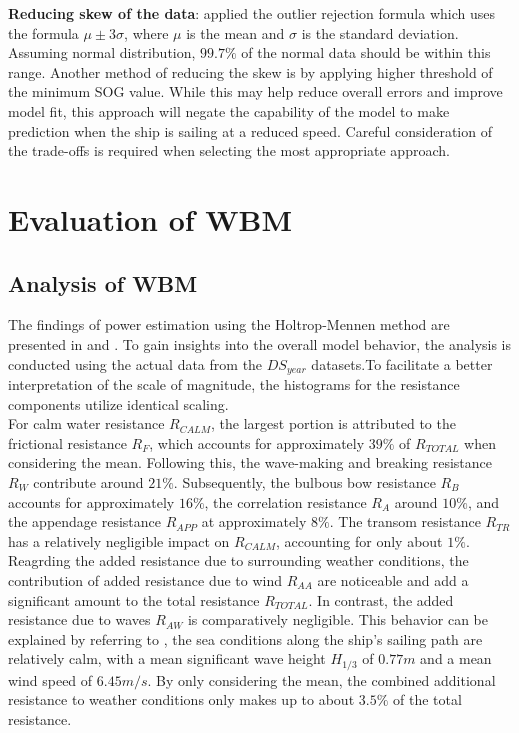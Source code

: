 \textbf{Reducing skew of the data}:  applied the outlier rejection formula which uses the formula $\mu \pm 3\sigma$, where $\mu$ is the mean and $\sigma$ is the standard deviation. Assuming normal distribution, $99.7\%$ of the normal data should be within this range. Another method of reducing the skew is by applying higher threshold of the minimum SOG value. While this may help reduce overall errors and improve model fit, this approach will negate the capability of the model to make prediction when the ship is sailing at a reduced speed. Careful consideration of the trade-offs is required when selecting the most appropriate approach.\\

\section{Evaluation of WBM}\label{sec:WBM_perf_eval}

\subsection{Analysis of WBM}\label{sec:Power_estimation_actual}

The findings of power estimation using the Holtrop-Mennen method are presented in  and . To gain insights into the overall model behavior, the analysis is conducted using the actual data from the $DS_{year}$ datasets.To facilitate a better interpretation of the scale of magnitude, the histograms for the resistance components utilize identical scaling.\\

For calm water resistance $R_{CALM}$, the largest portion is attributed to the frictional resistance $R_F$, which accounts for approximately $39\%$ of $R_{TOTAL}$ when considering the mean. Following this, the wave-making and breaking resistance $R_W$ contribute around $21\%$. Subsequently, the bulbous bow resistance $R_{B}$ accounts for approximately $16\%$, the correlation resistance $R_{A}$ around $10\%$, and the appendage resistance $R_{APP}$ at approximately $8\%$. The transom resistance $R_{TR}$ has a relatively negligible impact on $R_{CALM}$, accounting for only about $1\%$.\\

Reagrding the added resistance due to surrounding weather conditions, the contribution of added resistance due to wind $R_{AA}$ are noticeable and add a significant amount to the total resistance $R_{TOTAL}$. In contrast, the added resistance due to waves $R_{AW}$ is comparatively negligible. This behavior can be explained by referring to , the sea conditions along the ship's sailing path are relatively calm, with a mean significant wave height $H_{1/3}$ of $0.77 m$ and a mean wind speed of $6.45 m/s$. By only considering the mean, the combined additional resistance to weather conditions only makes up to about $3.5\%$ of the total resistance.\\

